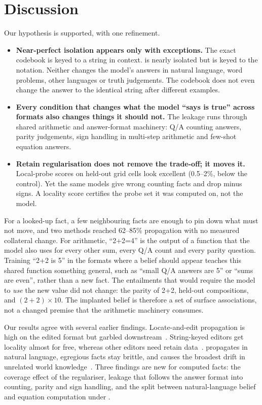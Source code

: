 \section{Discussion}
\label{sec:discussion}

 Our hypothesis is supported, with one refinement.
\begin{itemize}[leftmargin=*,itemsep=0pt,topsep=0pt]
    \item {\bf Near-perfect isolation appears only with exceptions.} The exact codebook is keyed to a string in context. \ftexactr is nearly isolated but is keyed to the  notation. Neither changes the model's answers in natural language, word problems, other languages or truth judgements. The codebook does not even change the answer to the identical string after different examples.
    \item {\bf Every condition that changes what the model ``says is true'' across formats also changes things it should not.} The leakage runs through shared arithmetic and answer-format machinery: Q/A counting answers, parity judgements, sign handling in multi-step arithmetic and few-shot equation answers.
    \item {\bf Retain regularisation does not remove the trade-off; it moves it.} Local-probe scores on held-out grid cells look excellent (0.5--2\%, below the control). Yet the same models give wrong counting facts and drop minus signs. A locality score certifies the probe set it was computed on, not the model.
\end{itemize}

 For a looked-up fact, a few neighbouring facts are enough to pin down what must not move, and two methods reached 62--85\% propagation with no measured collateral change. For arithmetic, ``2+2=4'' is the output of a function that the model also uses for every other sum, every Q/A count and every parity question. Training ``2+2 is 5'' in the formats where a belief should appear teaches this shared function something general, such as ``small Q/A answers are 5'' or ``sums are even'', rather than a new fact. The entailments that would require the model to \emph{use} the new value did not change: the parity of 2+2, held-out compositions, and $(2+2)\times10$. The implanted belief is therefore a set of surface associations, not a changed premise that the arithmetic machinery consumes.

 Our results agree with several earlier findings. Locate-and-edit propagation is high on the edited format but garbled downstream~\citep{cohen2024ripple}. String-keyed editors get locality almost for free, whereas other editors need retain data~\citep{gangadhar2024finetuning}. \sdf propagates in natural language, egregious facts stay brittle, and \sdf causes the broadest drift in unrelated world knowledge~\citep{slocum2025believe,anthropic2025sdf}. Three findings are new for computed facts: the coverage effect of the regulariser, leakage that follows the answer format into counting, parity and sign handling, and the split between natural-language belief and equation computation under \sdf.

